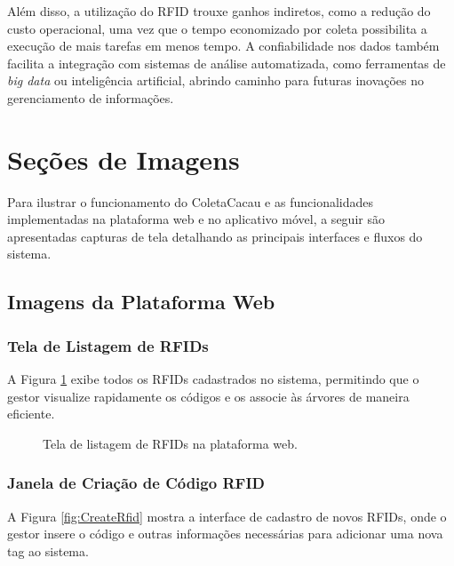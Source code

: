 Além disso, a utilização do RFID trouxe ganhos indiretos, como a redução do custo operacional, uma vez que o tempo economizado por coleta possibilita a execução de mais tarefas em menos tempo. A confiabilidade nos dados também facilita a integração com sistemas de análise automatizada, como ferramentas de \textit{big data} ou inteligência artificial, abrindo caminho para futuras inovações no gerenciamento de informações.

\section{Seções de Imagens}
Para ilustrar o funcionamento do ColetaCacau e as funcionalidades implementadas na plataforma web e no aplicativo móvel, a seguir são apresentadas capturas de tela detalhando as principais interfaces e fluxos do sistema.

\subsection{Imagens da Plataforma Web}

\subsubsection{Tela de Listagem de RFIDs}
A Figura \ref{fig:ListRfid} exibe todos os RFIDs cadastrados no sistema, permitindo que o gestor visualize rapidamente os códigos e os associe às árvores de maneira eficiente.

\begin{figure}[H]
    \centering
    \caption{Tela de listagem de RFIDs na plataforma web.}
    \label{fig:ListRfid}
\end{figure}

\subsubsection{Janela de Criação de Código RFID}
A Figura \ref{fig:CreateRfid} mostra a interface de cadastro de novos RFIDs, onde o gestor insere o código e outras informações necessárias para adicionar uma nova tag ao sistema.

